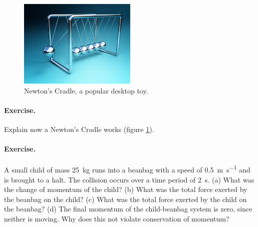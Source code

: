 \documentclass[a4paper]{amsbook}
\newcommand\capcite[1]{}
\begin{document}
\begin{figure}
  \centering
  \includegraphics[width=0.5\textwidth]{newtoncradle}
  \caption{Newton's Cradle, a popular desktop toy. \capcite{http://images.tutorvista.com/cms/images/95/conservation-of-momentum-experiment1.jpg}\label{fig:babynewton}}
\end{figure}

\paragraph{Exercise.} Explain now a Newton's Cradle works (figure \ref{fig:babynewton}).

\paragraph{Exercise.} A small child of mass \SI{25}{\kilo\gram} runs into a beanbag with a speed of \SI{0.5}{\metre\per\second} and is brought to a
halt. The collision occurs over a time period of \SI{2}{\second}. (a) What was the change of momentum of the child? (b) What was the total force
exerted by the beanbag on the child? (c) What was the total force exerted by the child on the beanbag? (d) The final momentum of the child-beanbag
system is zero, since neither is moving. Why does this not violate conservation of momentum?
\end{document}
